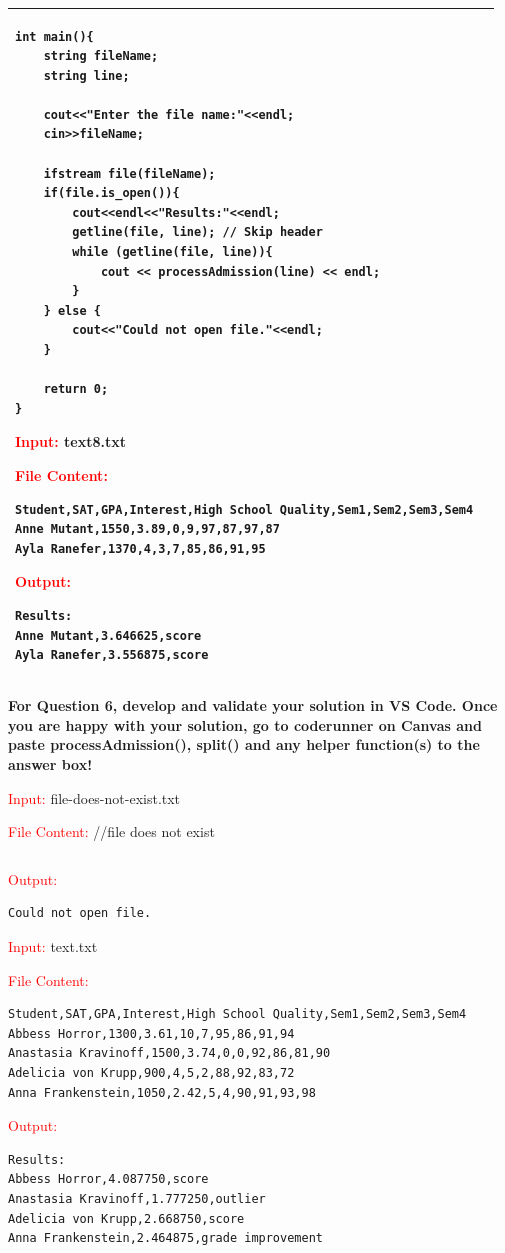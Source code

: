 \begin{longtable}{|p{1.7in}|p{4.3in}|}
\begin{example}
\begin{verbatim}
int main(){
    string fileName;
    string line;
    
    cout<<"Enter the file name:"<<endl;
    cin>>fileName;
    
    ifstream file(fileName);
    if(file.is_open()){
        cout<<endl<<"Results:"<<endl;
        getline(file, line); // Skip header
        while (getline(file, line)){
            cout << processAdmission(line) << endl;
        }
    } else {
        cout<<"Could not open file."<<endl;
    }
    
    return 0;
}
        \end{verbatim}
        \end{example}

\begin{sample}
\textcolor{red}{Input:}
text8.txt

\textcolor{red}{File Content:}
\begin{verbatim}
Student,SAT,GPA,Interest,High School Quality,Sem1,Sem2,Sem3,Sem4
Anne Mutant,1550,3.89,0,9,97,87,97,87
Ayla Ranefer,1370,4,3,7,85,86,91,95
\end{verbatim}
\textcolor{red}{Output:}
\begin{verbatim}
Results:
Anne Mutant,3.646625,score
Ayla Ranefer,3.556875,score
\end{verbatim}
        \end{sample}\\\hline
\end{longtable}
 
\textbf{For Question 6, develop and validate your solution in VS Code. Once you are happy with your solution, go to coderunner on Canvas and paste processAdmission(), split() and any helper function(s) to the answer box!}

\begin{sample}
\textcolor{red}{Input:}
file-does-not-exist.txt

\textcolor{red}{File Content:}
//file does not exist
\begin{verbatim}
\end{verbatim}
\textcolor{red}{Output:}
\begin{verbatim}
Could not open file.
\end{verbatim}
        \end{sample}

\begin{sample}
\textcolor{red}{Input:}
text.txt

\textcolor{red}{File Content:}
\begin{verbatim}
Student,SAT,GPA,Interest,High School Quality,Sem1,Sem2,Sem3,Sem4
Abbess Horror,1300,3.61,10,7,95,86,91,94
Anastasia Kravinoff,1500,3.74,0,0,92,86,81,90
Adelicia von Krupp,900,4,5,2,88,92,83,72
Anna Frankenstein,1050,2.42,5,4,90,91,93,98
\end{verbatim}
\textcolor{red}{Output:}
\begin{verbatim}
Results:
Abbess Horror,4.087750,score
Anastasia Kravinoff,1.777250,outlier
Adelicia von Krupp,2.668750,score
Anna Frankenstein,2.464875,grade improvement
\end{verbatim}
        \end{sample}


